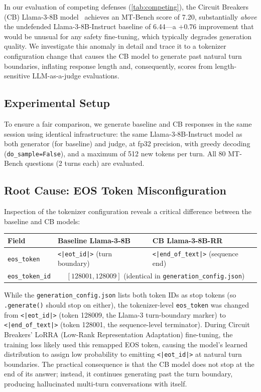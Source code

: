 In our evaluation of competing defenses (\cref{tab:competing}), the Circuit Breakers (CB) Llama-3-8B model~\citep{zou2024circuitbreakers} achieves an MT-Bench score of 7.20, substantially \emph{above} the undefended Llama-3-8B-Instruct baseline of 6.44---a $+0.76$ improvement that would be unusual for any safety fine-tuning, which typically degrades generation quality. We investigate this anomaly in detail and trace it to a tokenizer configuration change that causes the CB model to generate past natural turn boundaries, inflating response length and, consequently, scores from length-sensitive LLM-as-a-judge evaluations.

\subsection{Experimental Setup}

To ensure a fair comparison, we generate baseline and CB responses in the same session using identical infrastructure: the same Llama-3-8B-Instruct model as both generator (for baseline) and judge, at fp32 precision, with greedy decoding (\texttt{do\_sample=False}), and a maximum of 512 new tokens per turn. All 80 MT-Bench questions (2 turns each) are evaluated.

\subsection{Root Cause: EOS Token Misconfiguration}

Inspection of the tokenizer configuration reveals a critical difference between the baseline and CB models:

\begin{center}
\setlength{\tabcolsep}{8pt}
\renewcommand{\arraystretch}{1.15}
\begin{tabular}{@{}lll@{}}
\toprule
\textbf{Field} & \textbf{Baseline Llama-3-8B} & \textbf{CB Llama-3-8B-RR} \\
\midrule
\texttt{eos\_token} & \texttt{<|eot\_id|>} (turn boundary) & \texttt{<|end\_of\_text|>} (sequence end) \\
\texttt{eos\_token\_id} & \multicolumn{2}{c}{$[128001, 128009]$ (identical in \texttt{generation\_config.json})} \\
\bottomrule
\end{tabular}
\renewcommand{\arraystretch}{1.0}
\end{center}

While the \texttt{generation\_config.json} lists both token IDs as stop tokens (so \texttt{.generate()} should stop on either), the tokenizer-level \texttt{eos\_token} was changed from \texttt{<|eot\_id|>} (token 128009, the Llama-3 turn-boundary marker) to \texttt{<|end\_of\_text|>} (token 128001, the sequence-level terminator). During Circuit Breakers' LoRRA (Low-Rank Representation Adaptation) fine-tuning, the training loss likely used this remapped EOS token, causing the model's learned distribution to assign low probability to emitting \texttt{<|eot\_id|>} at natural turn boundaries. The practical consequence is that the CB model does not stop at the end of its answer; instead, it continues generating past the turn boundary, producing hallucinated multi-turn conversations with itself.

